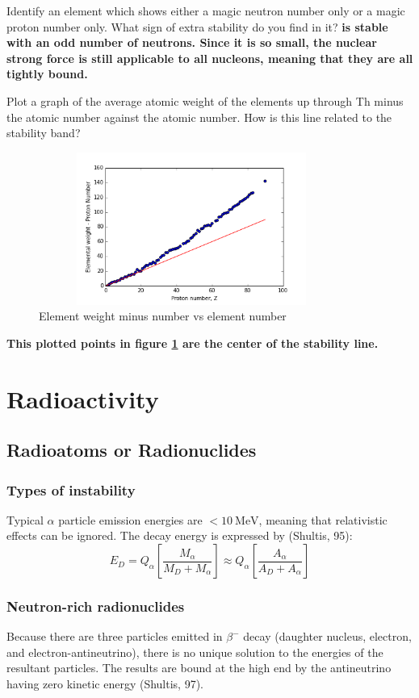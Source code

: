 \documentclass{article}
\begin{document}
Identify an element which shows either a magic neutron number only or a magic proton number only. What sign of extra stability do you find in it? \textbf{ is stable with an odd number of neutrons. Since it is so small, the nuclear strong force is still applicable to all nucleons, meaning that they are all tightly bound.}

Plot a graph of the average atomic weight of the elements up through Th minus the atomic number against the atomic number. How is this line related to the stability band?
\begin{figure}[h]
    \centering
    \includegraphics[width=10cm,height=5cm,keepaspectratio]{stability_line}
    \caption{Element weight minus number vs element number}
    \label{fig:stability_line}
\end{figure}
\textbf{This plotted points in figure \ref{fig:stability_line} are the center of the stability line.}


\newpage

\section{Radioactivity}

\subsection{Radioatoms or Radionuclides}

\subsubsection{Types of instability}
Typical $\alpha$ particle emission energies are $<\SI{10}{\mega\electronvolt}$, meaning that relativistic effects can be ignored. The decay energy is expressed by (Shultis, 95): $$ E_D = Q_\alpha \left[ \frac{M_\alpha}{M_D + M_\alpha} \right] \approx Q_\alpha \left[\frac{A_\alpha}{A_D + A_\alpha} \right] $$

\subsubsection{Neutron-rich radionuclides}
Because there are three particles emitted in $ \beta^- $ decay (daughter nucleus, electron, and electron-antineutrino), there is no unique solution to the energies of the resultant particles. The results are bound at the high end by the antineutrino having zero kinetic energy (Shultis, 97).
\end{document}
